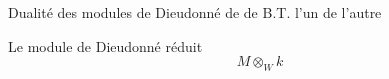 Dualité des modules de Dieudonné de  de B.T.  l'un de l'autre 

Le module de Dieudonné réduit
\[
M\otimes_{W} k
\]

